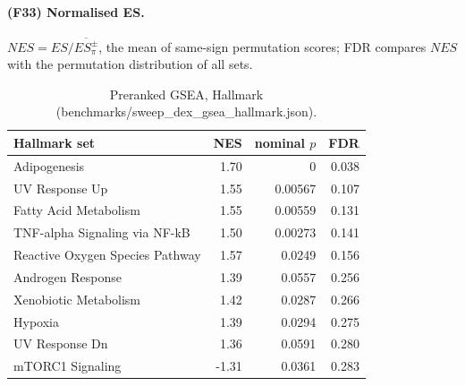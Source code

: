 \paragraph{(F33) Normalised ES.} $NES=ES/\overline{ES_{\pi}^{\pm}}$, the mean of same-sign permutation scores; FDR compares $NES$ with the permutation distribution of all sets.
\begin{table}[h]\centering\small\begin{tabular}{lrrr}\hline Hallmark set & NES & nominal $p$ & FDR\\\hline
Adipogenesis & 1.70 & 0 & 0.038\\
UV Response Up & 1.55 & 0.00567 & 0.107\\
Fatty Acid Metabolism & 1.55 & 0.00559 & 0.131\\
TNF-alpha Signaling via NF-kB & 1.50 & 0.00273 & 0.141\\
Reactive Oxygen Species Pathway & 1.57 & 0.0249 & 0.156\\
Androgen Response & 1.39 & 0.0557 & 0.256\\
Xenobiotic Metabolism & 1.42 & 0.0287 & 0.266\\
Hypoxia & 1.39 & 0.0294 & 0.275\\
UV Response Dn & 1.36 & 0.0591 & 0.280\\
mTORC1 Signaling & -1.31 & 0.0361 & 0.283\\
\hline\end{tabular}\caption{Preranked GSEA, Hallmark (benchmarks/sweep\_dex\_gsea\_hallmark.json).}\label{tab:gsea}\end{table}
